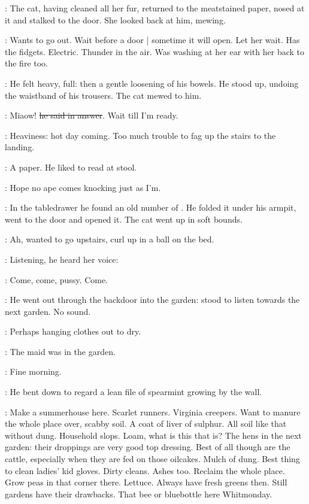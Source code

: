 :
The cat,
having cleaned all her fur,
returned to the meatstained paper,
nosed at it
and stalked to the door.
She looked back at him, mewing.

\BloomInt:
Wants to go out.
Wait before a door |
sometime it will open.
Let her wait.
Has the fidgets.
Electric.
Thunder in the air.
Was washing at her ear
with her back to the fire too.

:
He felt heavy, full:
then a gentle loosening of his bowels.
He stood up,
undoing the waistband of his trousers.
The cat mewed to him.

\Bloom:
Miaow!
\sout{he said in answer}.
Wait till I'm ready.

\BloomInt:
Heaviness: hot day coming.
Too much trouble to fag up the stairs to the landing.

:
A paper.
He liked to read at stool.

\BloomInt:
Hope no ape comes knocking just as I'm.

:
In the tabledrawer he found an old number of .
He folded it under his armpit,
went to the door and opened it.
The cat went up in soft bounds.

\BloomInt:
Ah, wanted to go upstairs,
curl up in a ball on the bed.

:
Listening, he heard her voice:

\Molly:
Come, come, pussy.
Come.

:
He went out through the backdoor into the garden:
stood to listen towards the next garden.
No sound.

\BloomInt:
Perhaps hanging clothes out to dry.

:
The maid was in the garden.

\Bloom:
Fine morning.

:
He bent down to regard a lean file of spearmint growing by the wall.

\BloomInt:
Make a summerhouse here.
Scarlet runners.
Virginia creepers.
Want to manure the whole place over,
scabby soil.
A coat of liver of sulphur.
All soil like that without dung.
Household slops.
Loam, what is this that is?
The hens in the next garden:
their droppings are very good top dressing.
Best of all though are the cattle,
especially when they are fed on those oilcakes.
Mulch of dung.
Best thing to clean ladies' kid gloves.
Dirty cleans.
Ashes too.
Reclaim the whole place.
Grow peas in that corner there.
Lettuce.
Always have fresh greens then.
Still gardens have their drawbacks.
That bee or bluebottle here Whitmonday.

